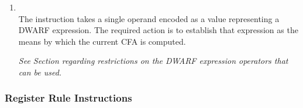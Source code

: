 \begin{enumerate}[1. ]
\item \textbf{\DWCFAdefcfaexpressionTARG} \\
The \DWCFAdefcfaexpressionTARG{} instruction takes a 
single operand encoded as a 
\DWFORMexprloc{} value representing a
DWARF expression. The required action is to establish that
expression as the means by which the current CFA is computed.

\textit{See Section  
regarding restrictions on the DWARF
expression operators that can be used.}

\end{enumerate}

\subsubsection{Register Rule Instructions}
\label{chap:registerruleinstructions}
